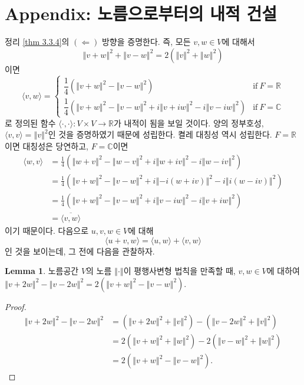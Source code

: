 \documentclass[11pt]{book}
\numberwithin{equation}{chapter}
\def\RR{\mathbb{R}}
\def\CC{\mathbb{C}}
\newcommand{\inner}[2]{\langle#1, #2\rangle}
\newcommand{\norm}[1]{\left\Vert#1\right\Vert}
\def\textif{\text{if}}
\theoremstyle{definition}
\newtheorem{lem}[thm]{Lemma}
\begin{document}
\section{Appendix: 노름으로부터의 내적 건설}

정리 \ref{thm 3.3.4}의 \((\Leftarrow)\) 방향을 증명한다. 즉, 모든 \(v, w \in V\)에 대해서
\[
    \norm{v+w}^2 + \norm{v-w}^2 = 2(\norm{v}^2 + \norm{w}^2)    
\]
이면
\[
    \inner{v}{w} =
        \begin{cases}
            \dfrac{1}{4}(\norm{v+w}^2 - \norm{v-w}^2) &\textif \ F = \RR\\
            \dfrac{1}{4}(\norm{v+w}^2 - \norm{v-w}^2 + i\norm{v+iw}^2 -i\norm{v-iw}^2) &\textif \ F = \CC
        \end{cases}  
\]
로 정의된 함수 \(\inner{\cdot}{\cdot} : V \times V \to \RR\)가 내적이 됨을 보일 것이다. 양의 정부호성, \(\inner{v}{v} = \norm{v}^2\)인 것을 증명하였기 때문에 성립한다. 켤레 대칭성 역시 성립한다. \(F = \RR\)이면 대칭성은 당연하고, \(F = \CC\)이면
\begin{align*}
    \inner{w}{v} &= \frac{1}{4}(\norm{w+v}^2 - \norm{w-v}^2 + i\norm{w+iv}^2 - i\norm{w-iv}^2)\\
    &= \frac{1}{4}(\norm{v+w}^2 - \norm{v-w}^2 + i\norm{-i(w+iv)}^2 - i\norm{i(w-iv)}^2)\\
    &= \frac{1}{4}(\norm{v+w}^2 - \norm{v-w}^2 + i\norm{v-iw}^2 - i\norm{v+iw}^2)\\
    &= \overline{\inner{v}{w}}
\end{align*}
이기 때문이다. 다음으로 \(u, v, w \in V\)에 대해
\begin{equation} \label{eq1}
    \inner{u + v}{w} = \inner{u}{w} + \inner{v}{w}
\end{equation}
인 것을 보이는데, 그 전에 다음을 관찰하자.
\begin{lem} \label{lem 3.4.1}
    노름공간 \(V\)의 노름 \(\norm{\cdot}\)이 평행사변형 법칙을 만족할 때, \(v, w \in V\)에 대하여 \(\norm{v+2w}^2 - \norm{v-2w}^2 = 2(\norm{v+w}^2 - \norm{v-w}^2)\).
\end{lem}
\begin{proof}
    \begin{align*}
        \norm{v+2w}^2 - \norm{v-2w}^2 &= (\norm{v+2w}^2 + \norm{v}^2) - (\norm{v-2w}^2 + \norm{v}^2)\\
        &= 2(\norm{v+w}^2 + \norm{w}^2) - 2(\norm{v-w}^2 + \norm{w}^2)\\
        &= 2(\norm{v+w}^2 - \norm{v-w}^2).
    \end{align*}
\end{proof}
\end{document}
